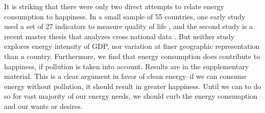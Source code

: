\documentclass[10pt, letterpaper]{article}
\begin{document}
\begin{spacing}{1.4}

It is striking that there were only two direct attempts to
relate energy consumption to happiness.   %
 In a small sample of 55 countries, one early study used a set of 27 indicators to measure
 quality of life \cite{mazur74}, and the second study is a recent master
 thesis that  analyzes cross national data \cite{winfrey13}. But neither
 study  explores energy intensity of GDP, nor variation at finer geographic representation than a country.
Furthermore, we find that energy consumption does contribute to happiness, if pollution is
taken into account. Results are in the supplementary material. This is a clear argument in favor of clean energy--if we can
consume energy without pollution, it should result in greater happiness. Until
we can to do so for vast majority of our energy needs, we should curb the energy consumption and
our wants or desires.


\end{spacing}
\end{document}
